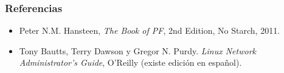 \documentclass{beamer}
\begin{document}
\begin{frame}
\frametitle{Referencias}

\begin{itemize}
\item Peter N.M. Hansteen, \textit{The Book of PF}, 2nd Edition, No Starch, 2011.
\item Tony Bautts, Terry Dawson y Gregor N. Purdy. \textit{Linux Network Administrator's Guide}, O'Reilly (existe edición en español).
\end{itemize}

\end{frame}






\end{document}
